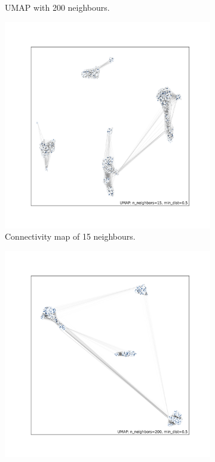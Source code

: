 \documentclass[12pt]{article}
\begin{document}
\begin{figure}[h!]
\begin{subfigure}[b]{0.48\linewidth}
    \caption{UMAP with 200 neighbours.}
    \label{fig:UMAP_high_NN_1KGP}
  \end{subfigure}
  \begin{subfigure}[b]{0.48\linewidth}
    \includegraphics[width=\linewidth]{code/images/UMAP_connectivity_low_NN.png}
    \caption{Connectivity map of 15 neighbours.}
    \label{fig:UMAP_low_NN_connectivity}
  \end{subfigure}
  \begin{subfigure}[b]{0.48\linewidth}
    \includegraphics[width=\linewidth]{code/images/UMAP_connectivity_high_NN.png}

\end{subfigure}
\end{figure}
\end{document}
